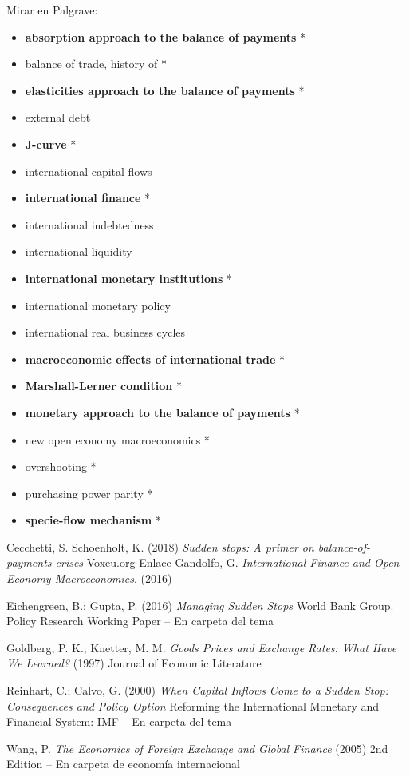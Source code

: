 \documentclass{nuevotema}
\begin{document}
Mirar en Palgrave:
\begin{itemize}
	\item \textbf{absorption approach to the balance of payments} *
	\item balance of trade, history of *
	\item \textbf{elasticities approach to the balance of payments} *
	\item external debt
	\item \textbf{J-curve} *
	\item international capital flows
	\item \textbf{international finance} *
	\item international indebtedness
	\item international liquidity
	\item \textbf{international monetary institutions} *
	\item international monetary policy
	\item international real business cycles
	\item \textbf{macroeconomic effects of international trade} *
	\item \textbf{Marshall-Lerner condition} *
	\item \textbf{monetary approach to the balance of payments} *
	\item new open economy macroeconomics *
	\item overshooting *
	\item purchasing power parity *
	\item \textbf{specie-flow mechanism} *
\end{itemize}

Cecchetti, S. Schoenholt, K. (2018) \textit{Sudden stops: A primer on balance-of-payments crises} Voxeu.org \href{https://voxeu.org/content/sudden-stops-primer-balance-payments-crises}{Enlace}
Gandolfo, G. \textit{International Finance and Open-Economy Macroeconomics}. (2016)

Eichengreen, B.; Gupta, P. (2016) \textit{Managing Sudden Stops} World Bank Group. Policy Research Working Paper -- En carpeta del tema

Goldberg, P. K.; Knetter, M. M. \textit{Goods Prices and Exchange Rates: What Have We Learned?} (1997) Journal of Economic Literature

Reinhart, C.; Calvo, G. (2000) \textit{When Capital Inflows Come to a Sudden Stop: Consequences and Policy Option} Reforming the International Monetary and Financial System: IMF -- En carpeta del tema 

Wang, P. \textit{The Economics of Foreign Exchange and Global Finance} (2005) 2nd Edition -- En carpeta de economía internacional
\end{document}

